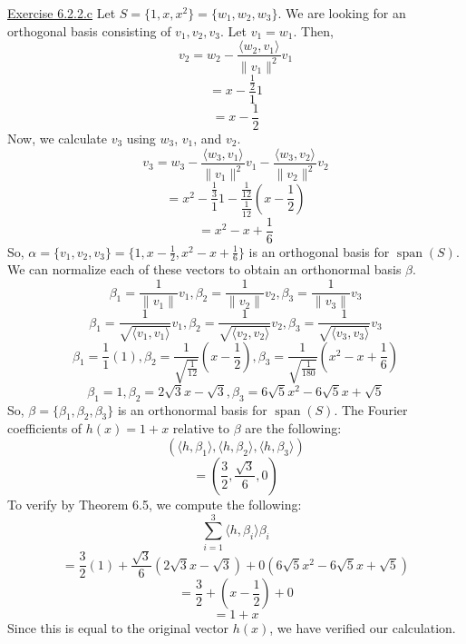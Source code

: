 \documentclass{exam}
\begin{document}
\underline{Exercise 6.2.2.c}
\newline
\newline
Let $S=\{1,x,x^2\}=\{w_1,w_2,w_3\}$. We are looking for an orthogonal basis consisting of $v_1,v_2,v_3$. Let $v_1=w_1$. Then,
\[v_2=w_2-\frac{\langle w_2,v_1\rangle}{\|v_1\|^2}v_1\]
\[=x-\frac{\frac{1}{2}}{1}1\]
\[=x-\frac{1}{2}\]
Now, we calculate $v_3$ using $w_3$, $v_1$, and $v_2$.
\[v_3=w_3-\frac{\langle w_3,v_1\rangle}{\|v_1\|^2}v_1-\frac{\langle w_3,v_2\rangle}{\|v_2\|^2}v_2\]
\[=x^2-\frac{\frac{1}{3}}{1}1-\frac{\frac{1}{12}}{\frac{1}{12}}\left(x-\frac{1}{2}\right)\]
\[=x^2-x+\frac{1}{6}\]
So, $\alpha=\{v_1,v_2,v_3\}=\{1,x-\frac{1}{2},x^2-x+\frac{1}{6}\}$ is an orthogonal basis for $\operatorname{span}(S)$. We can normalize each of these vectors to obtain an orthonormal basis $\beta$.
\[\beta_1=\frac{1}{\|v_1\|}v_1,\beta_2=\frac{1}{\|v_2\|}v_2,\beta_3=\frac{1}{\|v_3\|}v_3\]
\[\beta_1=\frac{1}{\sqrt{\langle v_1,v_1\rangle}}v_1,\beta_2=\frac{1}{\sqrt{\langle v_2,v_2\rangle}}v_2,\beta_3=\frac{1}{\sqrt{\langle v_3,v_3\rangle}}v_3\]
\[\beta_1=\frac{1}{1}(1),\beta_2=\frac{1}{\sqrt{\frac{1}{12}}}\left(x-\frac{1}{2}\right),\beta_3=\frac{1}{\sqrt{\frac{1}{180}}}\left(x^2-x+\frac{1}{6}\right)\]
\[\beta_1=1,\beta_2=2\sqrt{3}x-\sqrt{3},\beta_3=6\sqrt{5}x^2-6\sqrt{5}x+\sqrt{5}\]
So, $\beta=\{\beta_1,\beta_2,\beta_3\}$ is an orthonormal basis for $\operatorname{span}(S)$. The Fourier coefficients of $h(x)=1+x$ relative to $\beta$ are the following:
\[(\langle h,\beta_1\rangle,\langle h,\beta_2\rangle,\langle h,\beta_3\rangle)\]
\[=\left(\frac{3}{2},\frac{\sqrt{3}}{6},0\right)\]
To verify by Theorem 6.5, we compute the following:
\[\sum_{i=1}^{3}\langle h,\beta_i\rangle\beta_i\]
\[=\frac{3}{2}(1)+\frac{\sqrt{3}}{6}\left(2\sqrt{3}x-\sqrt{3}\right)+0\left(6\sqrt{5}x^2-6\sqrt{5}x+\sqrt{5}\right)\]
\[=\frac{3}{2}+\left(x-\frac{1}{2}\right)+0\]
\[=1+x\]
Since this is equal to the original vector $h(x)$, we have verified our calculation.
\newline
\end{document}
